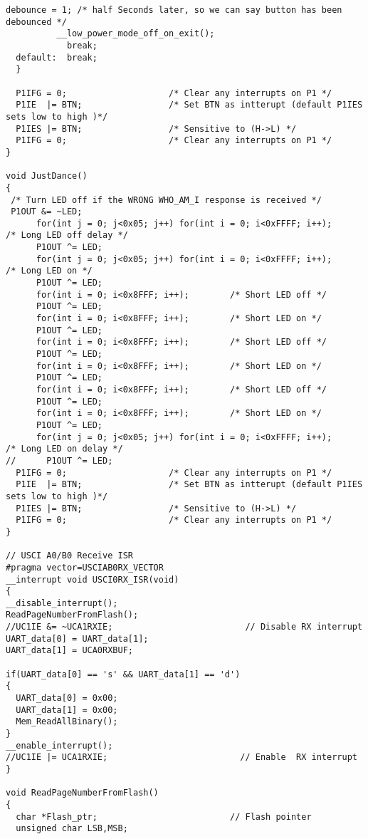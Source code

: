\begin{lstlisting}[caption=Main.c,label=Code4]
          debounce = 1; /* half Seconds later, so we can say button has been debounced */
          __low_power_mode_off_on_exit();   
            break;
  default:  break; 
  }
 
  P1IFG = 0;                    /* Clear any interrupts on P1 */
  P1IE  |= BTN;                 /* Set BTN as intterupt (default P1IES sets low to high )*/
  P1IES |= BTN;                 /* Sensitive to (H->L) */
  P1IFG = 0;                    /* Clear any interrupts on P1 */
}

void JustDance()
{
 /* Turn LED off if the WRONG WHO_AM_I response is received */
 P1OUT &= ~LED;                   
      for(int j = 0; j<0x05; j++) for(int i = 0; i<0xFFFF; i++);        /* Long LED off delay */
      P1OUT ^= LED;
      for(int j = 0; j<0x05; j++) for(int i = 0; i<0xFFFF; i++);        /* Long LED on */
      P1OUT ^= LED;
      for(int i = 0; i<0x8FFF; i++);        /* Short LED off */
      P1OUT ^= LED;
      for(int i = 0; i<0x8FFF; i++);        /* Short LED on */
      P1OUT ^= LED;
      for(int i = 0; i<0x8FFF; i++);        /* Short LED off */
      P1OUT ^= LED;
      for(int i = 0; i<0x8FFF; i++);        /* Short LED on */
      P1OUT ^= LED;
      for(int i = 0; i<0x8FFF; i++);        /* Short LED off */
      P1OUT ^= LED;
      for(int i = 0; i<0x8FFF; i++);        /* Short LED on */
      P1OUT ^= LED;
      for(int j = 0; j<0x05; j++) for(int i = 0; i<0xFFFF; i++);        /* Long LED on delay */
//      P1OUT ^= LED;                                                     
  P1IFG = 0;                    /* Clear any interrupts on P1 */
  P1IE  |= BTN;                 /* Set BTN as intterupt (default P1IES sets low to high )*/
  P1IES |= BTN;                 /* Sensitive to (H->L) */
  P1IFG = 0;                    /* Clear any interrupts on P1 */
}

// USCI A0/B0 Receive ISR
#pragma vector=USCIAB0RX_VECTOR
__interrupt void USCI0RX_ISR(void)
{
__disable_interrupt();
ReadPageNumberFromFlash();
//UC1IE &= ~UCA1RXIE;                          // Disable RX interrupt
UART_data[0] = UART_data[1];
UART_data[1] = UCA0RXBUF;

if(UART_data[0] == 's' && UART_data[1] == 'd')
{
  UART_data[0] = 0x00;
  UART_data[1] = 0x00;
  Mem_ReadAllBinary();
}
__enable_interrupt();
//UC1IE |= UCA1RXIE;                          // Enable  RX interrupt
}

void ReadPageNumberFromFlash()
{
  char *Flash_ptr;                          // Flash pointer
  unsigned char LSB,MSB;
  

\end{lstlisting}

